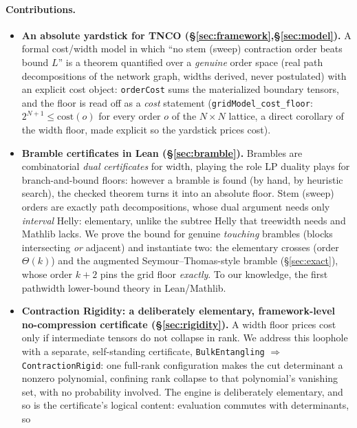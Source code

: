 \documentclass[sigplan,10pt,screen,review,anonymous]{acmart}
\begin{document}
\paragraph{Contributions.}
\begin{itemize}
  \item \textbf{An absolute yardstick for TNCO (\S\ref{sec:framework},\S\ref{sec:model}).}
    A formal cost/width model in which ``no stem (sweep) contraction order beats bound
    $L$'' is a theorem quantified over a \emph{genuine} order space (real path decompositions of
    the network graph, widths derived, never postulated) with an explicit cost object:
    \lstinline|orderCost| sums the materialized boundary tensors, and the floor is read off
    as a \emph{cost} statement (\lstinline|gridModel_cost_floor|:
    $2^{N+1} \le \mathrm{cost}(o)$ for every order $o$ of the $N \times N$ lattice, a
    direct corollary of the width floor, made explicit so the yardstick prices cost).
  \item \textbf{Bramble certificates in Lean (\S\ref{sec:bramble}).} Brambles are
    combinatorial \emph{dual certificates} for width, playing the role LP duality plays for
    branch-and-bound floors: however a bramble is found (by hand, by heuristic search),
    the checked theorem turns it into an absolute floor. Stem (sweep) orders are exactly
    path decompositions, whose dual argument needs only \emph{interval} Helly:
    elementary, unlike the subtree Helly that treewidth needs and Mathlib lacks. We prove
    the bound for genuine \emph{touching} brambles (blocks intersecting \emph{or} adjacent)
    and instantiate two: the elementary crosses (order $\Theta(k)$) and the augmented
    Seymour--Thomas-style bramble (\S\ref{sec:exact}), whose order $k+2$ pins the grid
    floor \emph{exactly}. To our knowledge, the first pathwidth lower-bound theory in
    Lean/Mathlib.
  \item \textbf{Contraction Rigidity: a deliberately elementary, framework-level
    no-compression certificate (\S\ref{sec:rigidity}).} A width floor prices cost only if intermediate tensors do
    not collapse in rank. We address this loophole with a separate, self-standing
    certificate, \lstinline|BulkEntangling|
    $\Rightarrow$ \lstinline|ContractionRigid|: one full-rank configuration makes the cut
    determinant a nonzero polynomial, confining rank collapse to that polynomial's vanishing
    set, with no probability involved. The engine is deliberately elementary, and so is the
    certificate's logical content: evaluation commutes with determinants, so

\end{itemize}
\end{document}
